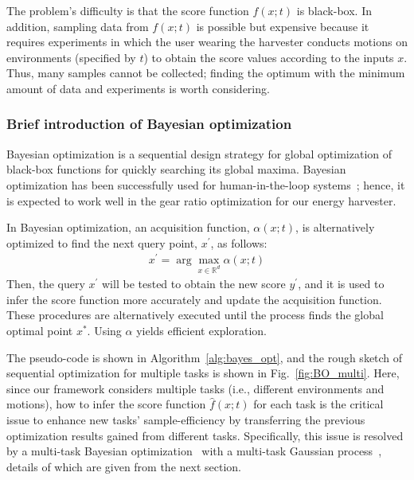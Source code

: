 \documentclass[twocolumn]{svjour3}          %
\begin{document}
The problem's difficulty is that the score function $f(x; t)$ is black-box.
In addition, sampling data from $f(x; t)$ is possible but expensive because it requires experiments in which the user wearing the harvester conducts motions on environments (specified by $t$) to obtain the score values according to the inputs $x$.
Thus, many samples cannot be collected; finding the optimum with the minimum amount of data and experiments is worth considering.

\subsubsection{Brief introduction of Bayesian optimization}

Bayesian optimization is a sequential design strategy for global optimization of black-box functions for quickly searching its global maxima.
Bayesian optimization has been successfully used for human-in-the-loop systems~\cite{matsubara2016data,thatte2017sample,gordon2018bayesian}; hence, it is expected to work well in the gear ratio optimization for our energy harvester.

In Bayesian optimization, an acquisition function, $\alpha (x; t)$, is alternatively optimized to find the next query point, $x^\prime$, as follows:
\begin{align}
x^\prime = \arg \max_{x \in \mathbb{R}^d} \alpha(x; t) \label{eq:sample_x}
\end{align}
Then, the query $x^\prime$ will be tested to obtain the new score $y^\prime$, and it is used to infer the score function more accurately and update the acquisition function.
These procedures are alternatively executed until the process finds the global optimal point $x^*$.
Using $\alpha$ yields efficient exploration.

The pseudo-code is shown in Algorithm~\ref{alg:bayes_opt}, and the rough sketch of sequential optimization for multiple tasks is shown in Fig.~\ref{fig:BO_multi}.
Here, since our framework considers multiple tasks (i.e., different environments and motions), how to infer the score function $\hat f(x; t)$ for each task is the critical issue to enhance new tasks' sample-efficiency by transferring the previous optimization results gained from different tasks.
Specifically, this issue is resolved by a multi-task Bayesian optimization~\cite{swersky2013multi} with a multi-task Gaussian process~\cite{bonilla2008multi}, details of which are given from the next section.
\end{document}
